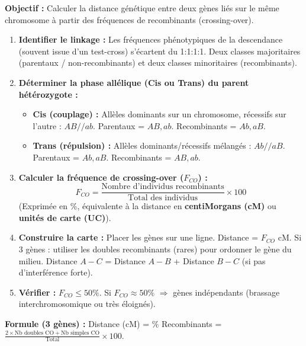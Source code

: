 \documentclass[11pt]{article}
\begin{document}
\begin{methode}
    \textbf{Objectif :} Calculer la distance génétique entre deux gènes liés sur le même chromosome à partir des fréquences de recombinants (crossing-over).
    \begin{enumerate}
        \item \textbf{Identifier le linkage :} Les fréquences phénotypiques de la descendance (souvent issue d'un test-cross) s'écartent du 1:1:1:1. Deux classes majoritaires (parentaux / non-recombinants) et deux classes minoritaires (recombinants).
        \item \textbf{Déterminer la phase allélique (Cis ou Trans) du parent hétérozygote :}
            \begin{itemize}
                \item \textbf{Cis (couplage) :} Allèles dominants sur un chromosome, récessifs sur l'autre : $AB // ab$. Parentaux = $AB, ab$. Recombinants = $Ab, aB$.
                \item \textbf{Trans (répulsion) :} Allèles dominants/récessifs mélangés : $Ab // aB$. Parentaux = $Ab, aB$. Recombinants = $AB, ab$.
            \end{itemize}
        \item \textbf{Calculer la fréquence de crossing-over ($F_{CO}$) :}
        \[ F_{CO} = \frac{\text{Nombre d'individus recombinants}}{\text{Total des individus}} \times 100 \]
        (Exprimée en \%, équivalente à la distance en \textbf{centiMorgans (cM)} ou \textbf{unités de carte (UC)}).
        \item \textbf{Construire la carte :} Placer les gènes sur une ligne. Distance = $F_{CO}$ cM. Si 3 gènes : utiliser les doubles recombinants (rares) pour ordonner le gène du milieu. Distance $A-C$ = Distance $A-B$ + Distance $B-C$ (si pas d'interférence forte).
        \item \textbf{Vérifier :} $F_{CO} \le 50\%$. Si $F_{CO} \approx 50\%$ $\Rightarrow$ gènes indépendants (brassage interchromosomique ou très éloignés).
    \end{enumerate}
    \textbf{Formule (3 gènes) :} Distance (cM) = $\%$ Recombinants = $\frac{2 \times \text{Nb doubles CO} + \text{Nb simples CO}}{\text{Total}} \times 100$.
\end{methode}
\end{document}
